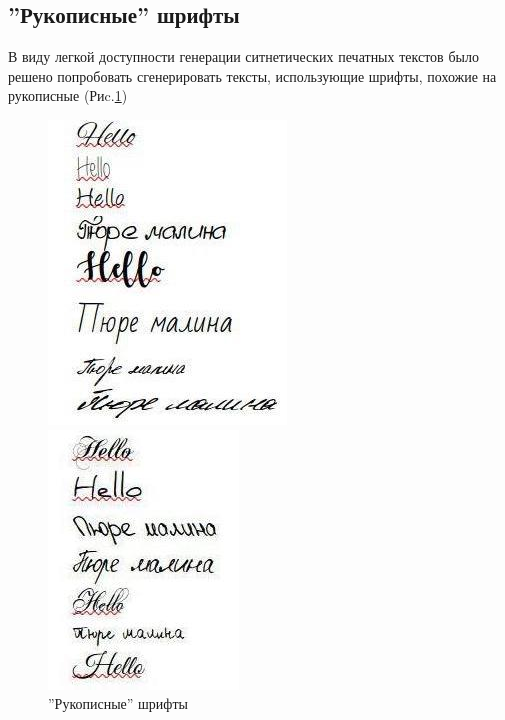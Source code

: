 \documentclass[12pt]{article}
\begin{document}
\subsection{''Рукописные'' шрифты}

В виду легкой доступности генерации ситнетических печатных текстов было решено попробовать сгенерировать тексты,
использующие шрифты, похожие на рукописные (Риc.\ref{fig:fonts})

\begin{figure}[htb]
    \centering
    \begin{minipage}{.5\textwidth}
        \centering
        \includegraphics[width=0.5\linewidth]{pure_malina.jpg}
    \end{minipage}%
    \begin{minipage}{.5\textwidth}
        \centering
        \includegraphics[width=0.5\linewidth]{pure_malina_1.jpeg}
    \end{minipage}
    \caption{''Рукописные'' шрифты}
    \label{fig:fonts}
\end{figure}
\end{document}
